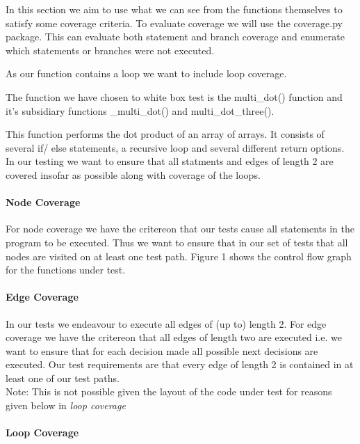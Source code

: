 In this section we aim to use what we can see from the functions themselves to satisfy some coverage
criteria. To evaluate coverage we will use the coverage.py package. This can evaluate both statement and branch coverage and enumerate which statements or branches were not executed.

As our function contains a loop we want to include loop coverage. 

The function we have chosen to white box test is the multi\_dot() function and it's subsidiary functions \_multi\_dot() and multi\_dot\_three().

This function performs the dot product of an array of arrays. It consists of several if/ else statements, a recursive loop and several different return options. In our testing we want to ensure that all statments and edges of length 2 are covered insofar as possible along with coverage of the loops. 



\paragraph{Node Coverage}


For node coverage we have the critereon that our tests cause all statements in the program to be executed. Thus we want to ensure that in our set of tests that all nodes are visited on at least one test path. Figure 1 shows the control flow graph for the functions under test. 



\paragraph{Edge Coverage}
In our tests we endeavour to execute all edges of (up to) length 2. 
For edge coverage we have the critereon that all edges of length two are executed i.e.
we want to ensure that for each decision made all possible next decisions are executed. 
Our test requirements are that every edge of length 2 is contained in at least one of our test paths.
\\
Note: This is not possible given the layout of the code under test for reasons given below in \emph{loop coverage}
\paragraph{Loop Coverage}

